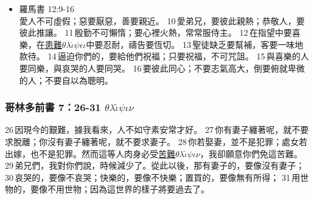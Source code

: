 \begin{itemize}
 \item{羅馬書 12:9-16} \\ 愛人不可虛假；惡要厭惡，善要親近。 10 愛弟兄，要彼此親熱；恭敬人，要彼此推讓。 11 殷勤不可懶惰；要心裡火熱，常常服侍主。 12 在指望中要喜樂，在\underline{患難$\theta$$\lambda$$\acute{\iota}$$\psi$$\epsilon$$\iota$}中要忍耐，禱告要恆切。 13 聖徒缺乏要幫補，客要一味地款待。 14 逼迫你們的，要給他們祝福；只要祝福，不可咒詛。 15 與喜樂的人要同樂，與哀哭的人要同哭。 16 要彼此同心；不要志氣高大，倒要俯就卑微的人；不要自以為聰明。 
\end{itemize}
 
 
\subsubsection{哥林多前書 7：26-31 $\theta$$\lambda$$\tilde{\iota}$$\psi$$\iota$$\nu$} 
26 因現今的艱難，據我看來，人不如守素安常才好。 27 你有妻子纏著呢，就不要求脫離；你沒有妻子纏著呢，就不要求妻子。 28 你若娶妻，並不是犯罪；處女若出嫁，也不是犯罪。然而這等人肉身必受\underline{苦難$\theta$$\lambda$$\tilde{\iota}$$\psi$$\iota$$\nu$}，我卻願意你們免這苦難。 29 弟兄們，我對你們說，時候減少了。從此以後，那有妻子的，要像沒有妻子； 30 哀哭的，要像不哀哭；快樂的，要像不快樂；置買的，要像無有所得； 31 用世物的，要像不用世物；因為這世界的樣子將要過去了。
 
 
